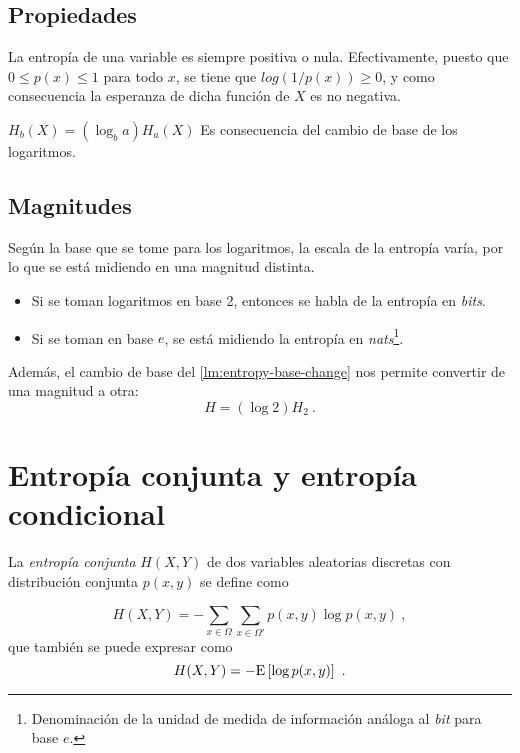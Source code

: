 \subsection{Propiedades}\label{propiedades}

\lemmab
La entropía de una variable es siempre positiva o nula. \proofb
Efectivamente, puesto que \(0\leq p(x)\leq 1\) para todo \(x\), se tiene
que \(log(1/p(x))\geq 0\), y como consecuencia la esperanza de dicha
función de \(X\) es no negativa. \proofe
\lemmae

\lemmab
\(H_b(X)=\left(\log_b a\right)H_a(X)\) \label{lm:entropy-base-change}
\proofb
Es consecuencia del cambio de base de los logaritmos. \proofe
\lemmae

\subsection{Magnitudes}\label{magnitudes}

Según la base que se tome para los logaritmos, la escala de la entropía
varía, por lo que se está midiendo en una magnitud distinta.

\begin{itemize}
\tightlist
\item
  Si se toman logaritmos en base 2, entonces se habla de la entropía en
  \emph{bits}.
\item
  Si se toman en base \(e\), se está midiendo la entropía en
  \emph{nats}\footnote{Denominación de la unidad de medida de información análoga al \emph{bit} para base $e$.}.
\end{itemize}

Además, el cambio de base del
\autoref{lm:entropy-base-change}
nos permite convertir de una magnitud a otra: \[H=(\log 2) H_2~.\]

\section{Entropía conjunta y entropía
condicional}\label{entropuxeda-conjunta-y-entropuxeda-condicional}

La \emph{entropía conjunta} \(H(X,Y)\) de dos variables aleatorias
discretas con distribución conjunta \(p(x,y)\) se define como

\begin{equation}H(X,Y)=-\sum_{x\in\Omega}\sum_{x\in\Omega'}p(x,y)\log p(x,y)~,\end{equation}
que también se puede expresar como
\begin{equation}H(X,Y)=-\mathrm{E}\left[\log p(x,y)\right]~.\end{equation}

